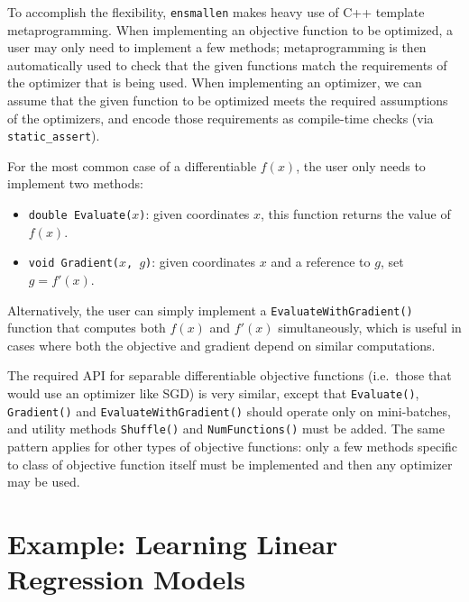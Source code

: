\documentclass{article}
\begin{document}
To accomplish the flexibility, {\tt ensmallen} makes heavy use of
C++ template metaprogramming.
When implementing an objective function to be optimized,
a user may only need to implement a few methods; metaprogramming is then automatically
used to check that the given functions match the requirements of the
optimizer that is being used.  When implementing an optimizer, we can assume
that the given function to be optimized meets the required assumptions of the
optimizers, and encode those requirements as compile-time checks
(via \texttt{\small static\_assert}).

For the most common case of a differentiable $f(x)$, the user only needs to
implement two methods:

\vspace*{-0.3em}
\begin{itemize} \itemsep -1pt
  \item \texttt{\small double Evaluate($x$)}: given coordinates $x$, this function
returns the value of $f(x)$.
  \item \texttt{\small void Gradient($x$, $g$)}: given coordinates $x$ and a reference
to $g$, set $g = f'(x)$.
\end{itemize}
\vspace*{-0.3em}

Alternatively, the user can simply implement a \texttt{\small EvaluateWithGradient()}
function that computes both $f(x)$ and $f'(x)$ simultaneously, which is useful
in cases where both the objective and gradient depend on similar computations.

The required API for separable differentiable objective functions (i.e.~those
that would use an optimizer like SGD) is very similar, except that
\texttt{\small Evaluate()}, \texttt{\small Gradient()} and \texttt{\small EvaluateWithGradient()}
should operate only on mini-batches, and utility methods \texttt{\small Shuffle()} and
\texttt{\small NumFunctions()} must be added.  The same pattern applies for other
types of objective functions: only a few methods specific to class of objective
function itself must be implemented and then any optimizer may be used.

\vspace*{-0.3em}
\section{Example: Learning Linear Regression Models}
\label{sec:linreg_example}
\vspace*{-0.5em}
\end{document}
